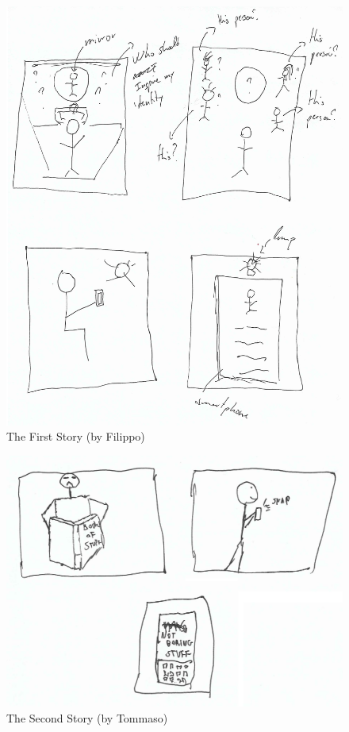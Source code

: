 \documentclass[12pt]{scrartcl}
\begin{document}
	\begin{figure}[H]
        		\centering
       		\includegraphics[width=\textwidth]{../images/story1.jpg}
       		\caption{The First Story (by Filippo)}
        		\label{story1}
	\end{figure}
	
	\begin{figure}[H]
        		\centering
       		\includegraphics[width=\textwidth]{../images/story2.jpg}
       		\caption{The Second Story (by Tommaso)}
        		\label{story2}
	\end{figure}
	
\end{document}
